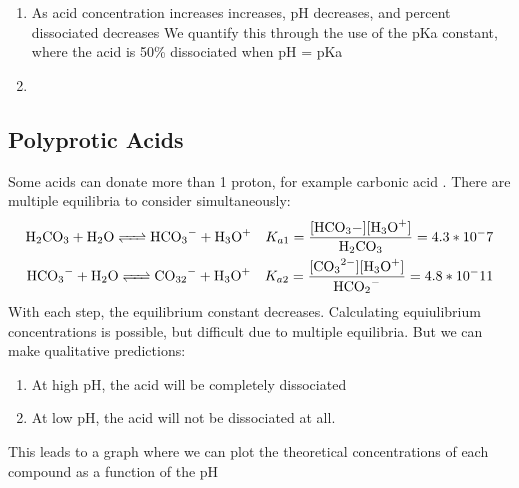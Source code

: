 \documentclass{article}  %
\begin{document}
\begin{enumerate}
    \item As acid concentration increases  increases, pH decreases, and percent dissociated decreases
    We quantify this through the use of the pKa constant, where the acid is 50\% dissociated when pH = pKa %
    \item 
\end{enumerate}

\subsection*{Polyprotic Acids}
Some acids can donate more than 1 proton, for example carbonic acid .
There are multiple equilibria to consider simultaneously:
\begin{equation*}
    \begin{aligned}
        \ce{H2CO3 + H2O <=> HCO3- + H3O+} \quad K_{a1} = \ce{\frac{[HCO3-][H3O+]}{H2CO3}} = 4.3*10^-7  \\
        \ce{HCO3- + H2O <=> CO32- + H3O+} \quad K_{a2} = \ce{\frac{[CO3^2-][H3O+]}{HCO2-}} = 4.8*10^-11 \\
    \end{aligned}
\end{equation*}
With each step, the equilibrium constant decreases. 
\newline 
Calculating equiulibrium concentrations is possible, but difficult due to multiple equilibria. But we can make qualitative predictions:
\begin{enumerate}
    \item At high pH, the acid will be completely dissociated
    \item At low pH, the acid will not be dissociated at all.
\end{enumerate}
This leads to a graph where we can plot the theoretical concentrations of each compound as a function of the pH
\end{document}
